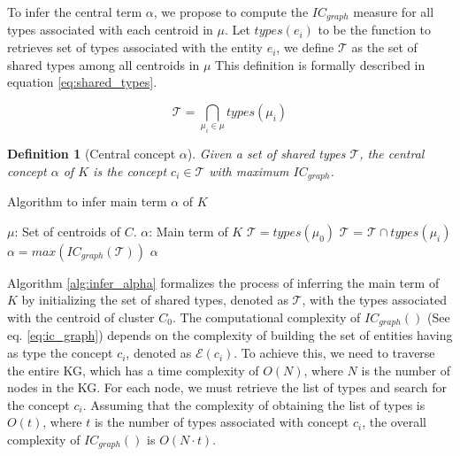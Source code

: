 \documentclass{ieeeaccess}
\newtheorem{Definition}{Definition}
\begin{document}
To infer the central term $\alpha$, we propose to
compute the $IC_{graph}$ measure for all types 
associated with each centroid in $\mu$. Let 
$types(e_{i})$ to be the function to retrieves
set of types associated with the entity $e_{i}$, 
we define $\mathcal{T}$ as the set of shared types
among all centroids in $\mu$ This definition is formally
described in equation \ref{eq:shared_types}.

\begin{equation}
    \label{eq:shared_types}
    \mathcal{T} = \bigcap_{\mu_{i} \in \mu} types(\mu_{i})
\end{equation}

\begin{Definition}[Central concept $\alpha$]
Given a set of shared types 
$\mathcal{T}$, the central concept $\alpha$ of $K$ is the concept
$c_{i} \in \mathcal{T}$ with maximum $IC_{graph}$.
\end{Definition}

\begin{algorithm}
\caption{Algorithm to infer main term $\alpha$ of $K$}
\label{alg:infer_alpha}
\begin{algorithmic}[1]
\renewcommand{\algorithmicrequire}{\textbf{Input:}}
\renewcommand{\algorithmicensure}{\textbf{Output:}}
\REQUIRE $\mu$: Set of centroids of $C$.
\ENSURE $\alpha$: Main term of $K$
\STATE $\mathcal{T} = types(\mu_{0})$ 
    \STATE $\mathcal{T}$ = $\mathcal{T} \cap types(\mu_{i})$ 
\ENDFOR
\STATE $\alpha = max(IC_{graph}(\mathcal{T}))$
\RETURN $\alpha$
\end{algorithmic} 
\end{algorithm}

Algorithm \ref{alg:infer_alpha} formalizes the 
process of inferring the main term of $K$ by 
initializing the set of shared types, denoted
as $\mathcal{T}$, with the types associated with
the centroid of cluster $C_{0}$. The computational
complexity of $IC_{graph}()$ (See eq. \ref{eq:ic_graph})
depends on the complexity of building the set
of entities having as type the concept 
$c_{i}$, denoted as $\mathcal{E}(c_{i})$. To 
achieve this, we need to traverse the entire KG,
which has a time complexity of $O(N)$, 
where $N$ is the number of nodes in the KG. 
For each node, we must retrieve the list of types
and search for the concept $c_{i}$. Assuming that
the complexity of obtaining the list of types is
$O(t)$, where $t$ is the number of types 
associated with concept $c_{i}$, the overall
complexity of $IC_{graph}()$ is $O(N \cdot t)$.
\end{document}
